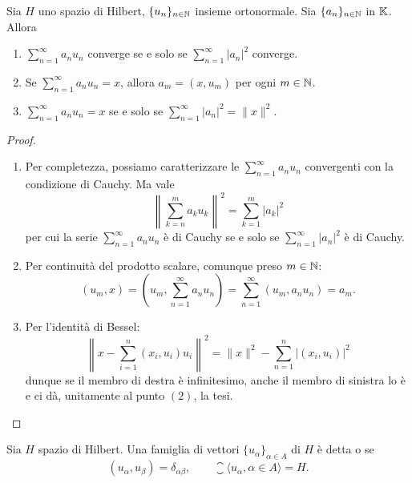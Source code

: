 \begin{lemma}
\label{lemma:hilb_ten}
	Sia $H$ uno spazio di Hilbert, $\{u_n\}_{n \in \mathbb{N}}$ insieme ortonormale. Sia $\{a_n\}_{n \in \mathbb{N}}$ in $\mathbb{K}$.
	Allora
	\begin{enumerate}
		\item $\sum_{n=1}^\infty a_n u_n$ converge se e solo se $\sum_{n=1}^\infty |a_n|^2$ converge.
		\item Se $\sum_{n=1}^\infty a_n u_n = x$, allora $a_m = (x, u_m)$ per ogni $m \in \mathbb{N}$.
		\item $\sum_{n=1}^\infty a_n u_n = x$ se e solo se $\sum_{n=1}^\infty |a_n|^2 = \|x\|^2$.
	\end{enumerate}
\end{lemma}
\begin{proof}
	\leavevmode
	\begin{enumerate}
		\item Per completezza, possiamo caratterizzare le $\sum_{n=1}^\infty a_n u_n$ convergenti con la condizione di Cauchy. Ma vale
		\begin{equation*}
			\left\| \sum_{k=n}^m a_k u_k \right\|^2 = \sum_{k=1}^m |a_k|^2
		\end{equation*}
		per cui la serie $\sum_{n=1}^\infty a_n u_n$ è di Cauchy se e solo se $\sum_{n=1}^\infty |a_n|^2$ è di Cauchy.

		\item Per continuità del prodotto scalare, comunque preso $m \in \mathbb{N}$:
		\begin{equation*}
			(u_m, x) = (u_m, {\textstyle \sum_{n=1}^\infty} a_n u_n) = \sum_{n=1}^\infty (u_m, a_n u_n) = a_m.
		\end{equation*}

		\item Per l'identità di Bessel:
		\begin{equation*}
			\left\|x - \sum_{i=1}^n (x_i,u_i)u_i \right\|^2 = \|x\|^2 - \sum_{n=1}^n |(x_i,u_i)|^2
		\end{equation*}
		dunque se il membro di destra è infinitesimo, anche il membro di sinistra lo è  e ci dà, unitamente al punto $(2)$, la tesi.
	\end{enumerate}
\end{proof}

\begin{definition}
	Sia $H$ spazio di Hilbert. Una famiglia di vettori $\{u_\alpha\}_{\alpha \in A}$ di $H$ è detta  o  se
	\begin{equation*}
		(u_\alpha, u_\beta) = \delta_{\alpha\beta}, \qquad \closure{\langle u_\alpha, \alpha \in A \rangle} = H.
	\end{equation*}
\end{definition}

